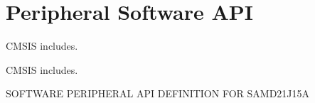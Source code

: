 \hypertarget{group___s_a_m_d21_j15_a__api}{}\section{Peripheral Software A\+PI}
\label{group___s_a_m_d21_j15_a__api}


C\+M\+S\+IS includes.  


C\+M\+S\+IS includes. 

S\+O\+F\+T\+W\+A\+RE P\+E\+R\+I\+P\+H\+E\+R\+AL A\+PI D\+E\+F\+I\+N\+I\+T\+I\+ON F\+OR S\+A\+M\+D21\+J15A 